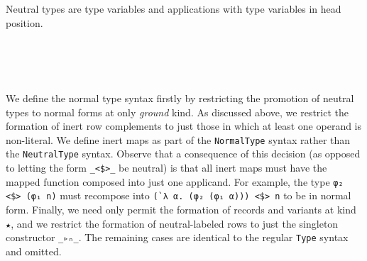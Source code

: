 \documentclass[authoryear, acmsmall, screen, review, nonacm]{acmart} %
\begin{document}
Neutral types are type variables and applications with type variables in head position.

\begin{code}%
\>[0]\AgdaSpace{}%
\AgdaSpace{}%
\AgdaSpace{}%
\AgdaSymbol{:}\AgdaSpace{}%
\AgdaSpace{}%
\AgdaSpace{}%
\AgdaSpace{}%
\<%
\\
\>[0][@{}l@{\AgdaIndent{0}}]%
\>[2]\AgdaSpace{}%
\AgdaSymbol{:}\AgdaSpace{}%
\AgdaSymbol{(}\AgdaSpace{}%
\AgdaSymbol{:}\AgdaSpace{}%
\AgdaSpace{}%
\AgdaSpace{}%
\AgdaSymbol{)}\AgdaSpace{}%
%
\>[24]\AgdaSpace{}%
\AgdaSpace{}%
\<%
\\
%
\>[2]\AgdaSpace{}%
\AgdaSymbol{:}%
\>[2778I]\AgdaSymbol{(}\AgdaSpace{}%
\AgdaSymbol{:}\AgdaSpace{}%
\AgdaSpace{}%
\AgdaSpace{}%
\AgdaSymbol{(}\AgdaSpace{}%
\AgdaSpace{}%
\AgdaSymbol{))}\AgdaSpace{}%
\AgdaSpace{}%
\AgdaSymbol{(}\AgdaSpace{}%
\AgdaSymbol{:}\AgdaSpace{}%
\AgdaSpace{}%
\AgdaSpace{}%
\AgdaSymbol{)}\AgdaSpace{}%
\<%
\\
\>[.][@{}l@{}]\<[2778I]%
\>[8]\AgdaSpace{}%
\AgdaSpace{}%
\<%
\end{code}

We define the normal type syntax firstly by restricting the promotion of neutral types to normal forms at only \emph{ground} kind. As discussed above, we restrict the formation of inert row complements to just those in which at least one operand is non-literal. We define inert maps as part of the \verb!NormalType! syntax rather than the \verb!NeutralType! syntax. Observe that a consequence of this decision (as opposed to letting the form \verb!_<$>_! be neutral) is that all inert maps must have the mapped function composed into just one applicand. For example, the type \verb!φ₂ <$> (φ₁ n)! must recompose into \verb!(`λ α. (φ₂ (φ₁ α))) <$> n! to be in normal form. Finally, we need only permit the formation of records and variants at kind \verb!★!, and we restrict the formation of neutral-labeled rows to just the singleton constructor \verb!_▹ₙ_!. The remaining cases are identical to the regular \verb!Type! syntax and omitted.
\end{document}
